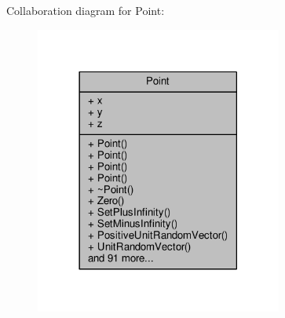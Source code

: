 Collaboration diagram for Point\+:
\nopagebreak
\begin{figure}[H]
\begin{center}
\leavevmode
\includegraphics[width=230pt]{d5/d3b/classPoint__coll__graph}
\end{center}
\end{figure}
